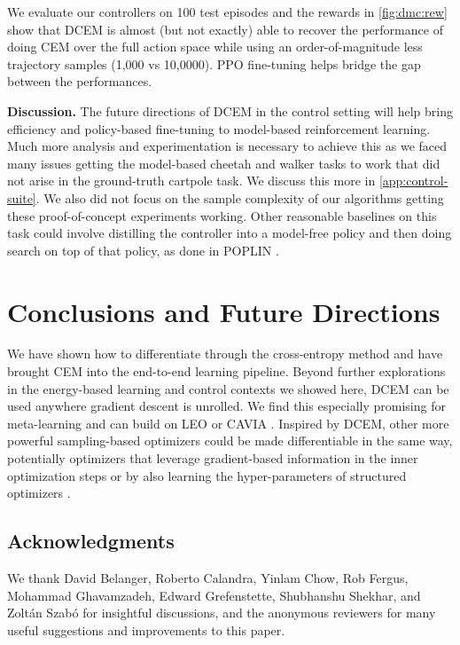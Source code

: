 \documentclass{article}
\begin{document}
We evaluate our controllers on 100 test episodes and
the rewards in \cref{fig:dmc:rew} show that DCEM
is almost (but not exactly) able to recover the
performance of doing CEM over the full action space
while using an order-of-magnitude less trajectory samples
(1,000 vs 10,0000).
PPO fine-tuning helps bridge the gap between the
performances.

\textbf{Discussion.}
The future directions of DCEM in the control setting
will help bring efficiency and policy-based
fine-tuning to model-based reinforcement learning.
Much more analysis and experimentation is necessary to
achieve this as we faced many issues getting the
model-based cheetah and walker tasks to work that
did not arise in the ground-truth cartpole task.
We discuss this more in \cref{app:control-suite}.
We also did not focus on the sample complexity of our
algorithms getting these proof-of-concept experiments working.
Other reasonable baselines on
this task could involve distilling the
controller into a model-free policy and
then doing search on top of that policy,
as done in POPLIN \citep{wang2019exploring}.

\section{Conclusions and Future Directions}
We have shown how to differentiate through the
cross-entropy method and have brought CEM into the
end-to-end learning pipeline.
Beyond further explorations in the energy-based learning and control contexts
we showed here, DCEM can be used anywhere gradient descent is unrolled.
We find this especially promising for meta-learning and
can build on LEO \citep{rusu2018meta} or CAVIA \citep{zintgraf2019fast}.
Inspired by DCEM, other more powerful sampling-based
optimizers could be made differentiable in the same way,
potentially optimizers that leverage gradient-based information
in the inner optimization steps
\citep{sekhon1998genetic,theodorou2010generalized,stulp2012path,maheswaranathan2018guided}
or by also learning the hyper-parameters of structured optimizers
\citep{li2016learning,volpp2019meta,chen2017learning}.

\subsection*{Acknowledgments}
We thank
David Belanger,
Roberto Calandra,
Yinlam Chow,
Rob Fergus,
Mohammad Ghavamzadeh,
Edward Grefenstette,
Shubhanshu Shekhar,
and
Zolt{\'a}n Szab{\'o}
for insightful discussions,
and the anonymous reviewers for many useful suggestions
and improvements to this paper.
\end{document}
